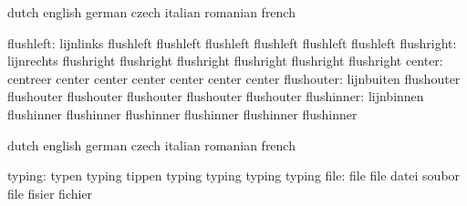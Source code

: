 \stopvariables


\startvariables            dutch                     english
                           german                    czech
                           italian                   romanian
                           french

                flushleft: lijnlinks                 flushleft
                           flushleft                 flushleft
                           flushleft                 flushleft
                           flushleft
               flushright: lijnrechts                flushright
                           flushright                flushright
                           flushright                flushright
                           flushright
                   center: centreer                  center
                           center                    center
                           center                    center
                           center
               flushouter: lijnbuiten                flushouter
                           flushouter                flushouter
                           flushouter                flushouter
                           flushouter
               flushinner: lijnbinnen                flushinner
                           flushinner                flushinner
                           flushinner                flushinner
                           flushinner

\stopvariables

\startvariables            dutch                     english
                           german                    czech
                           italian                   romanian
                           french

                   typing: typen                     typing
                           tippen                    typing
                           typing                    typing
                           typing
                     file: file                      file
                           datei                     soubor
                           file                      fisier
                           fichier

\stopvariables



